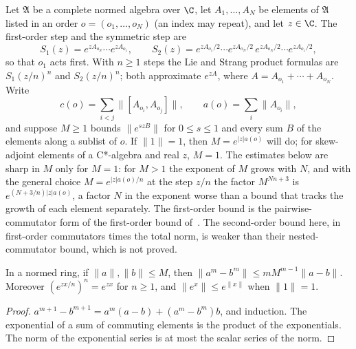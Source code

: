 Let $\mathfrak A$ be a complete normed algebra over $\C$, let $A_1,\dots,A_N$
be elements of $\mathfrak A$ listed in an order $o=(o_1,\dots,o_N)$ (an index
may repeat), and let $z\in\C$. The first-order step and the symmetric step are
\[
    S_1(z)=e^{zA_{o_N}}\cdots e^{zA_{o_1}},\qquad
    S_2(z)=e^{zA_{o_1}/2}\cdots e^{zA_{o_N}/2}\,e^{zA_{o_N}/2}\cdots
    e^{zA_{o_1}/2},
\]
so that $o_1$ acts first. With $n\geq1$ steps the Lie and Strang product
formulas are $S_1(z/n)^n$ and $S_2(z/n)^n$; both approximate $e^{zA}$, where
$A=A_{o_1}+\cdots+A_{o_N}$. Write
\[
    c(o)=\sum_{i<j}\lVert[A_{o_i},A_{o_j}]\rVert,\qquad
    a(o)=\sum_i\lVert A_{o_i}\rVert,
\]
and suppose $M\geq1$ bounds $\lVert e^{szB}\rVert$ for $0\leq s\leq1$ and every
sum $B$ of the elements along a sublist of $o$. If $\lVert1\rVert=1$, then
$M=e^{\lvert z\rvert a(o)}$ will do; for skew-adjoint elements of a C*-algebra
and real $z$, $M=1$. The estimates below are sharp in $M$ only for $M=1$: for
$M>1$ the exponent of $M$ grows with $N$, and with the general choice
$M=e^{\lvert z\rvert a(o)/n}$ at the step $z/n$ the factor $M^{Nn+3}$ is
$e^{(N+3/n)\lvert z\rvert a(o)}$, a factor $N$ in the exponent worse than a bound
that tracks the growth of each element separately. The first-order bound is the
pairwise-commutator form of the first-order bound
of~\cite{ChildsSuTranWiebeZhu2021TrotterError}. The second-order bound here, in
first-order commutators times the total norm, is weaker than their
nested-commutator bound, which is not proved.

\begin{lemma}[Telescoping]
    \label{lem:product_formula_telescoping}
    \leanok
    In a normed ring, if $\lVert a\rVert,\lVert b\rVert\leq M$, then
    $\lVert a^m-b^m\rVert\leq mM^{m-1}\lVert a-b\rVert$. Moreover
    $(e^{zx/n})^n=e^{zx}$ for $n\geq1$, and $\lVert e^x\rVert\leq e^{\lVert x\rVert}$
    when $\lVert1\rVert=1$.
\end{lemma}
\begin{proof}\leanok
    $a^{m+1}-b^{m+1}=a^m(a-b)+(a^m-b^m)b$, and induction. The exponential of a
    sum of commuting elements is the product of the exponentials. The norm of
    the exponential series is at most the scalar series of the norm.
\end{proof}

